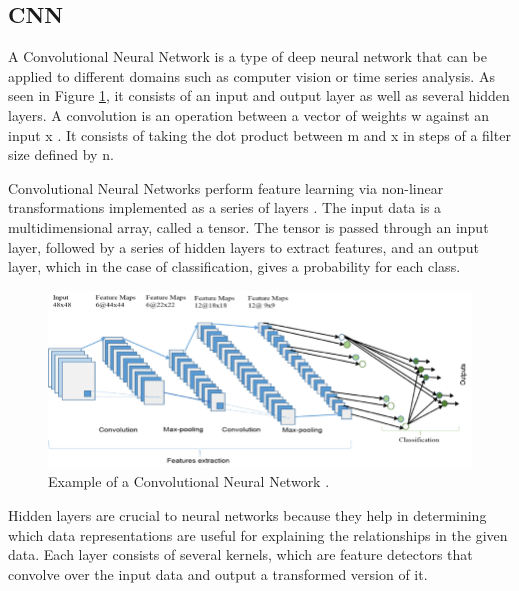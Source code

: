 \documentclass{turabian-thesis}
\newcounter{case}[section]
\begin{document}
\subsection{CNN}

A Convolutional Neural Network is a type of deep neural network that can be applied to different domains such as computer vision or time series analysis. As seen in Figure \ref{fig:cnn_example}, it consists of an input and output layer as well as several hidden layers. A convolution is an operation between a vector of weights w against an input x \cite{yamashita_convolutional_2018}. It consists of taking the dot product between m and x in steps of a filter size defined by n.

Convolutional Neural Networks perform feature learning via non-linear transformations implemented as a series of layers \cite{aqib_smarter_2019}. The input data is a multidimensional array, called a tensor. The tensor is passed through an input layer, followed by a series of hidden layers to extract features, and an output layer, which in the case of classification, gives a probability for each class. 

\begin{figure}[h!]
   \begin{center}
      \includegraphics[scale=0.5]{../media/cnn_example.png}
   \end{center}
   \caption{Example of a Convolutional Neural Network \cite{alom_state---art_2019}.}
   \label{fig:cnn_example}
\end{figure}

Hidden layers are crucial to neural networks because they help in determining which data representations are useful for explaining the relationships in the given data. Each layer consists of several kernels,  which are feature detectors that convolve over the input data and output a transformed version of it. 
\end{document}

